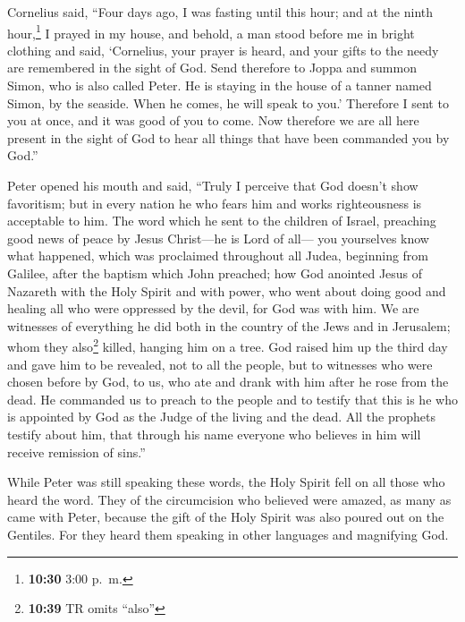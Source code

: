  Cornelius said, ``Four days ago, I was fasting until
this hour; and at the ninth hour,\footnote{\textbf{10:30} 3:00 p.~m.} I
prayed in my house, and behold, a man stood before me in bright clothing
 and said, `Cornelius, your prayer is heard, and your
gifts to the needy are remembered in the sight of God. 
Send therefore to Joppa and summon Simon, who is also called Peter. He
is staying in the house of a tanner named Simon, by the seaside. When he
comes, he will speak to you.'  Therefore I sent to you at
once, and it was good of you to come. Now therefore we are all here
present in the sight of God to hear all things that have been commanded
you by God.''

 Peter opened his mouth and said, ``Truly I perceive that
God doesn't show favoritism;  but in every nation he who
fears him and works righteousness is acceptable to him. 
The word which he sent to the children of Israel, preaching good news of
peace by Jesus Christ---he is Lord of all---  you
yourselves know what happened, which was proclaimed throughout all
Judea, beginning from Galilee, after the baptism which John preached;
 how God anointed Jesus of Nazareth with the Holy Spirit
and with power, who went about doing good and healing all who were
oppressed by the devil, for God was with him.  We are
witnesses of everything he did both in the country of the Jews and in
Jerusalem; whom they also\footnote{\textbf{10:39} TR omits ``also''}
killed, hanging him on a tree.  God raised him up the
third day and gave him to be revealed,  not to all the
people, but to witnesses who were chosen before by God, to us, who ate
and drank with him after he rose from the dead.  He
commanded us to preach to the people and to testify that this is he who
is appointed by God as the Judge of the living and the dead.
 All the prophets testify about him, that through his
name everyone who believes in him will receive remission of sins.''

 While Peter was still speaking these words, the Holy
Spirit fell on all those who heard the word.  They of the
circumcision who believed were amazed, as many as came with Peter,
because the gift of the Holy Spirit was also poured out on the Gentiles.
 For they heard them speaking in other languages and
magnifying God.

